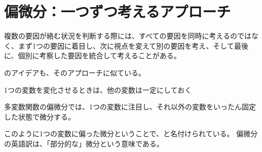 \documentclass[../../../topic_calculus]{subfiles}
\begin{document}
\sectionline
\section{偏微分：一つずつ考えるアプローチ}

複数の要因が絡む状況を判断する際には、すべての要因を同時に考えるのではなく、まず1つの要因に着目し、次に視点を変えて別の要因を考え、そして最後に、個別に考察した要因を統合して考えることがある。

\br

のアイデアも、そのアプローチに似ている。

\begin{emphabox}
  \begin{spacebox}
    \begin{center}
    1つの変数を変化させるときは、他の変数は一定にしておく
  \end{center}
  \end{spacebox}
\end{emphabox}

多変数関数の偏微分では、1つの変数に注目し、それ以外の変数をいったん固定した状態で微分する。

\br

このように1つの変数に偏った微分ということで、と名付けられている。
偏微分の英語訳は、「部分的な」微分という意味である。
\end{document}
